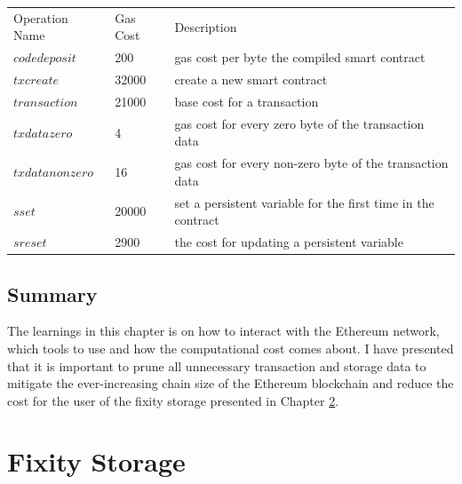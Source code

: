 \documentclass[final]{vutinfth}
\begin{document}
\begin{center}
    \begin{tabular}{ l l l }\label{table:gas-costs}
        Operation Name & Gas Cost & Description \\ 
        $codedeposit$ & 200 & gas cost per byte the compiled smart contract \\  
        $txcreate$ & 32000 & create a new smart contract  \\   
        $transaction$ & 21000 & base cost for a transaction \\
        $txdatazero$ & 4 & gas cost for every zero byte of the transaction data  \\   
        $txdatanonzero$ & 16 & gas cost for every non-zero byte of the transaction data  \\   
        $sset$ & 20000 & set a persistent variable for the first time in the contract \\
        $sreset$ & 2900 & the cost for updating a persistent variable 
    \end{tabular}
\end{center}

\section{Summary}
The learnings in this chapter is on how to interact with the Ethereum network, which tools to use and how the computational cost comes about. I have presented that it is important to prune all unnecessary transaction and storage data to mitigate the ever-increasing chain size of the Ethereum blockchain and reduce the cost for the user of the fixity storage presented in Chapter \ref{ch:fixity-storage}.  \chapter{Fixity Storage}
\label{ch:fixity-storage}
\end{document}
